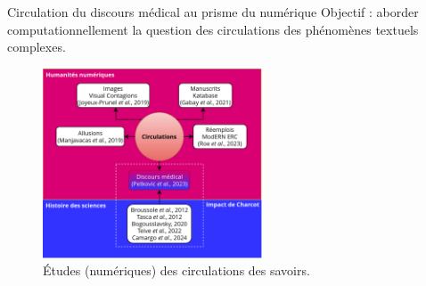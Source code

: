 \begin{frame}{Circulation du discours médical au prisme du numérique}
\centering
Objectif : aborder computationnellement la question des circulations des phénomènes textuels complexes.
\begin{figure}
    \centering
    \includegraphics[width=65mm,scale=0.5]{pic/dh_histoire-sciences.png}
    \caption{Études (numériques) des circulations des savoirs.}
    \label{fig:enter-label}
\end{figure}
\nocite{camargo2024}
\end{frame}

